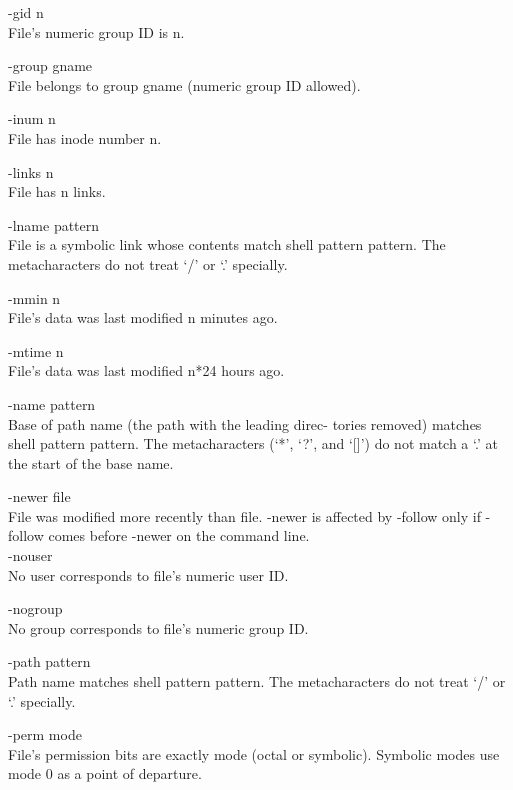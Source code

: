 \begin{description}
       -gid n  \\
              File's numeric group ID is n.

       -group gname \\
              File belongs  to  group  gname  (numeric  group  ID
              allowed).

       -inum n \\
              File has inode number n.

       -links n \\
              File has n links.

       -lname pattern \\
              File  is a symbolic link whose contents match shell
              pattern pattern.  The metacharacters do  not  treat
              `/' or `.' specially.

       -mmin n \\
              File's data was last modified n minutes ago.

       -mtime n \\
              File's data was last modified n*24 hours ago.

       -name pattern \\
              Base of path name (the path with the leading direc-
              tories removed) matches shell pattern pattern.  The
              metacharacters  (`*', `?', and `[]') do not match a
              `.' at the start of the base name.

       -newer file \\
              File was modified more recently than file.   -newer
              is affected by -follow only if -follow comes before
              -newer on the command line. \\

       -nouser \\
              No user corresponds to file's numeric user ID.

       -nogroup \\
              No group corresponds to file's numeric group ID.

       -path pattern \\
              Path  name  matches  shell  pattern  pattern.   The
              metacharacters do not treat `/' or `.' specially.

       -perm mode \\
              File's  permission  bits are exactly mode (octal or
              symbolic).  Symbolic modes use mode 0 as a point of
              departure.


\end{description}

